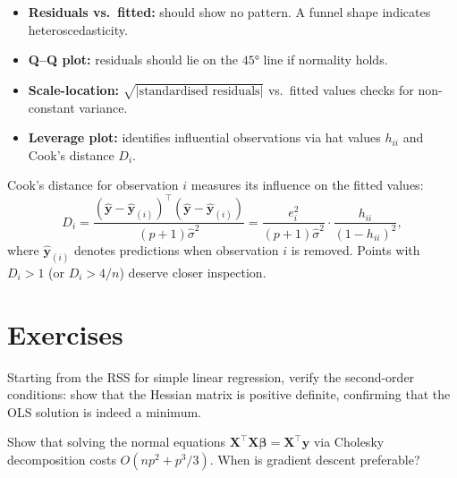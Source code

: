 \begin{bestpractice}[title=\textbf{Diagnostic Plots}]
\begin{itemize}
    \item \textbf{Residuals vs.\ fitted:} should show no pattern. A funnel shape indicates heteroscedasticity.
    \item \textbf{Q--Q plot:} residuals should lie on the $45°$ line if normality holds.
    \item \textbf{Scale-location:} $\sqrt{|\text{standardised residuals}|}$ vs.\ fitted values checks for non-constant variance.
    \item \textbf{Leverage plot:} identifies influential observations via hat values $h_{ii}$ and Cook's distance $D_i$.
\end{itemize}
\end{bestpractice}

\begin{definition}
Cook's distance for observation $i$ measures its influence on the fitted values:
\[
    D_i = \frac{(\hat{\bm{y}} - \hat{\bm{y}}_{(i)})^\top(\hat{\bm{y}} - \hat{\bm{y}}_{(i)})}{(p+1)\hat{\sigma}^2}
    = \frac{e_i^2}{(p+1)\hat{\sigma}^2}\cdot\frac{h_{ii}}{(1-h_{ii})^2},
\]
where $\hat{\bm{y}}_{(i)}$ denotes predictions when observation $i$ is removed. Points with $D_i > 1$ (or $D_i > 4/n$) deserve closer inspection.
\end{definition}

\section{Exercises}

\begin{exercise}[Derivation]
Starting from the RSS for simple linear regression, verify the second-order conditions: show that the Hessian matrix is positive definite, confirming that the OLS solution is indeed a minimum.
\end{exercise}

\begin{exercise}
Show that solving the normal equations $\bm{X}^\top\bm{X}\bm{\beta} = \bm{X}^\top\bm{y}$ via Cholesky decomposition costs $O(np^2 + p^3/3)$. When is gradient descent preferable?
\end{exercise}

